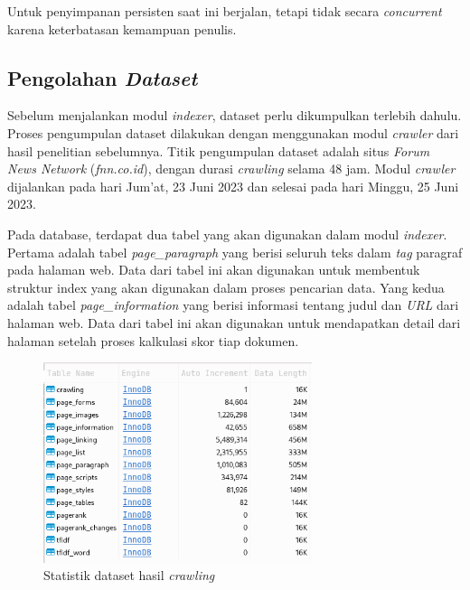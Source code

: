 Untuk penyimpanan persisten saat ini berjalan, tetapi tidak secara
\textit{concurrent} karena keterbatasan kemampuan penulis.

\subsection{Pengolahan \textit{Dataset}}

Sebelum menjalankan modul \textit{indexer}, dataset perlu dikumpulkan terlebih 
dahulu. Proses pengumpulan dataset dilakukan dengan menggunakan modul
\textit{crawler} dari hasil penelitian sebelumnya. Titik pengumpulan dataset 
adalah situs \textit{Forum News Network} (\textit{fnn.co.id}), dengan durasi
\textit{crawling} selama 48 jam. Modul \textit{crawler} dijalankan pada hari
Jum'at, 23 Juni 2023 dan selesai pada hari Minggu, 25 Juni 2023.

Pada database, terdapat dua tabel yang akan digunakan dalam modul
\textit{indexer}. Pertama adalah tabel \textit{page\_paragraph} yang berisi 
seluruh teks dalam \textit{tag} paragraf pada halaman web. Data dari tabel ini 
akan digunakan untuk membentuk struktur index yang akan digunakan dalam proses 
pencarian data. Yang kedua adalah tabel \textit{page\_information} yang berisi
informasi tentang judul dan \textit{URL} dari halaman web. Data dari tabel ini 
akan digunakan untuk mendapatkan detail dari halaman setelah proses kalkulasi 
skor tiap dokumen.

\begin{figure}[H]
  \centering{}
	\includegraphics[width=0.7\textwidth]{gambar/implementasi_statistik_dataset}
  \caption{Statistik dataset hasil \textit{crawling}}
\end{figure}

